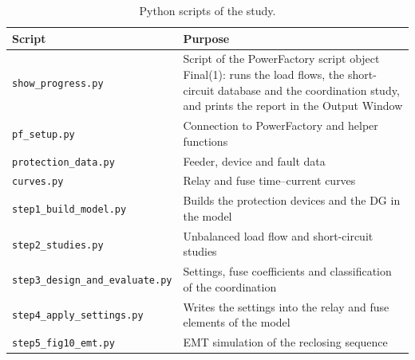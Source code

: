 \documentclass[12pt,a4paper]{article}
\begin{document}
\begin{table}[H]
\centering\small
\begin{tabularx}{\textwidth}{|l|L|}
\hline
\textbf{Script} & \textbf{Purpose} \\ \hline
\texttt{show\_progress.py} & Script of the PowerFactory script object Final(1): runs the load flows, the short-circuit database and the coordination study, and prints the report in the Output Window \\ \hline
\texttt{pf\_setup.py} & Connection to PowerFactory and helper functions \\ \hline
\texttt{protection\_data.py} & Feeder, device and fault data \\ \hline
\texttt{curves.py} & Relay and fuse time--current curves \\ \hline
\texttt{step1\_build\_model.py} & Builds the protection devices and the DG in the model \\ \hline
\texttt{step2\_studies.py} & Unbalanced load flow and short-circuit studies \\ \hline
\texttt{step3\_design\_and\_evaluate.py} & Settings, fuse coefficients and classification of the coordination \\ \hline
\texttt{step4\_apply\_settings.py} & Writes the settings into the relay and fuse elements of the model \\ \hline
\texttt{step5\_fig10\_emt.py} & EMT simulation of the reclosing sequence \\ \hline
\end{tabularx}
\caption{Python scripts of the study.}
\label{tab:scripts}
\end{table}
\end{document}
